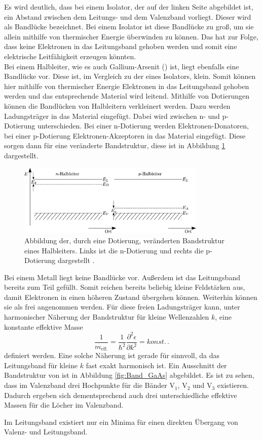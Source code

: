 Es wird deutlich, dass bei einem Isolator, der auf der linken Seite abgebildet ist, ein Abstand zwischen
dem Leitungs- und dem Valenzband vorliegt. Dieser wird als Bandlücke bezeichnet. Bei einem Isolator ist diese
Bandlücke zu groß, um sie allein mithilfe von thermischer Energie überwinden zu können. Das hat zur Folge,
dass keine Elektronen in das Leitungsband gehoben werden und somit eine elektrische Leitfähigkeit erzeugen könnten.\\
Bei einem Halbleiter, wie es auch Gallium-Arsenit () ist, liegt ebenfalls eine Bandlücke vor. Diese ist, im Vergleich
zu der eines Isolators, klein. Somit können hier mithilfe von thermischer Energie Elektronen in das Leitungsband
gehoben werden und das entsprechende Material wird leitend. Mithilfe von Dotierungen können die Bandlücken
von Halbleitern verkleinert werden. Dazu werden Ladungsträger in das Material eingefügt. Dabei wird zwischen
n- und p-Dotierung unterschieden. Bei einer n-Dotierung werden Elektronen-Donatoren, bei einer p-Dotierung
Elektronen-Akzeptoren in das Material eingefügt. Diese sorgen dann für eine veränderte Bandstruktur, diese
ist in Abbildung \ref{fig:BS_neu} dargestellt. \\
\begin{figure}[H]
    \centering
    \includegraphics[width=0.8\textwidth]{images/BS_neu.png}
    \caption{Abbildung der, durch eine Dotierung, veränderten Bandstruktur eines Halbleiters. Links ist die n-Dotierung und rechts die p-Dotierung dargestellt \cite{BS_neu}.}
    \label{fig:BS_neu}
\end{figure} \noindent
Bei einem Metall liegt keine Bandlücke vor. Außerdem ist das Leitungsband bereits zum Teil gefüllt. Somit reichen
bereits beliebig kleine Feldstärken aus, damit Elektronen in einen höheren Zustand übergehen können. Weiterhin
können sie als frei angenommen werden.
Für diese freien Ladungsträger kann, unter harmonischer Näherung der Bandstruktur für kleine Wellenzahlen $k$, eine konstante effektive Masse
\begin{equation}
  \frac{1}{m_\text{eff.}} = \frac{1}{\hbar^2}\frac{\partial^2 \epsilon}{\partial k^2} = konst. \, .
\end{equation}
definiert werden.
Eine solche Näherung ist gerade für  sinnvoll, da das Leitungsband für kleine $k$ fast exakt harmonisch ist.
Ein Ausschnitt der Bandstruktur von  ist in Abbildung \ref{fig:Band_GaAs} abgebildet.
Es ist zu sehen, dass im Valenzband drei Hochpunkte für die Bänder V$_1$, V$_2$ und V$_3$ existieren.
Dadurch ergeben sich dementsprechend auch drei unterschiedliche effektive Massen für die Löcher im Valenzband.\par
Im Leitungsband existiert nur ein Minima für einen direkten Übergang von Valenz- und Leitungsband.

